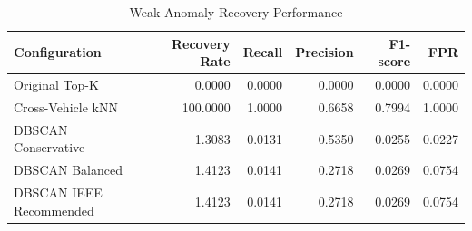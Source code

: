 \begin{table}[t]
\centering
\begin{tabular}{lrrrrr}
\toprule
Configuration & Recovery Rate & Recall & Precision & F1-score & FPR \\
\midrule
Original Top-K & 0.0000 & 0.0000 & 0.0000 & 0.0000 & 0.0000 \\
Cross-Vehicle kNN & 100.0000 & 1.0000 & 0.6658 & 0.7994 & 1.0000 \\
DBSCAN Conservative & 1.3083 & 0.0131 & 0.5350 & 0.0255 & 0.0227 \\
DBSCAN Balanced & 1.4123 & 0.0141 & 0.2718 & 0.0269 & 0.0754 \\
DBSCAN IEEE Recommended & 1.4123 & 0.0141 & 0.2718 & 0.0269 & 0.0754 \\
\bottomrule
\end{tabular}
\caption{Weak Anomaly Recovery Performance}
\label{tab:weak-recovery-operating-points}
\end{table}

